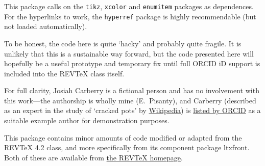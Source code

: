 \documentclass[%
  reprint,
  aps,
  pra,
  superscriptaddress,
  a4paper,
]{revtex4-2}
\begin{document}
This package calls on the \texttt{tikz}, \texttt{xcolor} and \texttt{enumitem} packages as dependences.
For the hyperlinks to work, the \texttt{hyperref} package is highly recommendable (but not loaded automatically).

To be honest, the code here is quite `hacky' and probably quite fragile.
It is unlikely that this is a sustainable way forward, but the code presented here will hopefully be a useful prototype and temporary fix until full ORCID iD support is included into the REVTeX class itself.

For full clarity, Josiah Carberry is a fictional person and has no involvement with this work---the authorship is wholly mine (E.\ Pisanty), and Carberry (described as an expert in the study of `cracked pots' by \href{https://en.wikipedia.org/wiki/Josiah_S._Carberry}{Wikipedia}) is \href{https://support.orcid.org/hc/en-us/articles/360006897674-Structure-of-the-ORCID-Identifier}{listed by ORCID} as a suitable example author for demonstration purposes.

This package contains minor amounts of code modified or adapted from the REVTeX 4.2 class, and more specifically from its component package ltxfront. Both of these are available from \href{https://journals.aps.org/revtex}{the REVTeX homepage}.

\listoforcidids
\end{document}
